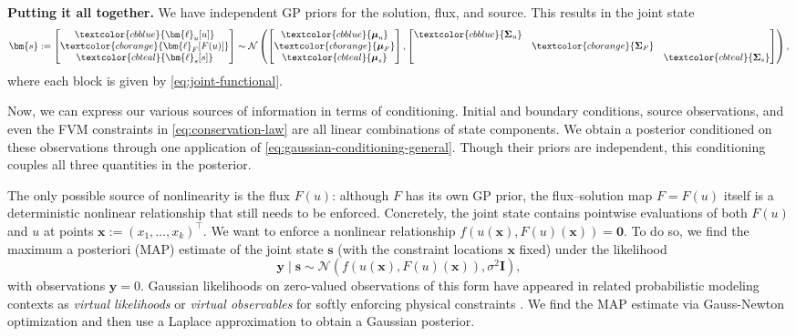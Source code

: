 \documentclass{article}
\theoremstyle{plain}
\theoremstyle{definition}
\theoremstyle{remark}
\newcommand{\termaccum}[1]{\textcolor{cbblue}{#1}}
\newcommand{\termflux}[1]{\textcolor{cborange}{#1}}
\newcommand{\termsource}[1]{\textcolor{cbteal}{#1}}
\newcommand{\Normal}{\mathcal{N}}
\newcommand{\bmu}{\boldsymbol{\mu}}
\newcommand{\bSigma}{\boldsymbol{\Sigma}}
\begin{document}
\textbf{Putting it all together.}
We have independent GP priors for the solution, flux, and source.
This results in the joint state
\begin{equation}
  \bm{s} := \begin{bmatrix} \termaccum{\bm{\ell}_u[u]} \\ \termflux{\bm{\ell}_F[F(u)]} \\ \termsource{\bm{\ell}_s[s]} \end{bmatrix}
  \sim \Normal\left(
  \begin{bmatrix} \termaccum{\bmu_u} \\ \termflux{\bmu_F} \\ \termsource{\bmu_s} \end{bmatrix},
  \begin{bmatrix}
      \termaccum{\bSigma_u} &                      &                        \\
                            & \termflux{\bSigma_F} &                        \\
                            &                      & \termsource{\bSigma_s}
    \end{bmatrix}
  \right),
  \label{eq:joint-state}
\end{equation}
where each block is given by \cref{eq:joint-functional}.

Now, we can express our various sources of information in terms of conditioning.
Initial and boundary conditions, source observations, and even the FVM constraints in \cref{eq:conservation-law} are all linear combinations of state components.
We obtain a posterior conditioned on these observations through one application of \cref{eq:gaussian-conditioning-general}.
Though their priors are independent, this conditioning couples all three quantities in the posterior.

The only possible source of nonlinearity is the flux $F(u)$: although $F$ has its own GP prior, the flux--solution map $F = F(u)$ itself is a deterministic nonlinear relationship that still needs to be enforced.
Concretely, the joint state contains pointwise evaluations of both $F(u)$ and $u$ at points $\bm{x} := (x_1, \dots, x_k)^\top$.
We want to enforce a nonlinear relationship $f(u(\bm{x}), F(u)(\bm{x})) = \bm{0}$.
To do so, we find the maximum a posteriori (MAP) estimate of the joint state $\bm{s}$ (with the constraint locations $\bm{x}$ fixed) under the likelihood
\begin{equation}
  \bm{y} \mid \bm{s} \sim \mathcal{N}(f(u(\bm{x}), F(u)(\bm{x})), \sigma^2 \bm{I}),
\end{equation}
with observations $\bm{y} = 0$.
Gaussian likelihoods on zero-valued observations of this form have appeared in related probabilistic modeling contexts as \emph{virtual likelihoods} or \emph{virtual observables} for softly enforcing physical constraints \citep{kaltenbachIncorporatingPhysicalConstraints2020}.
We find the MAP estimate via Gauss-Newton optimization and then use a Laplace approximation to obtain a Gaussian posterior.
\end{document}
